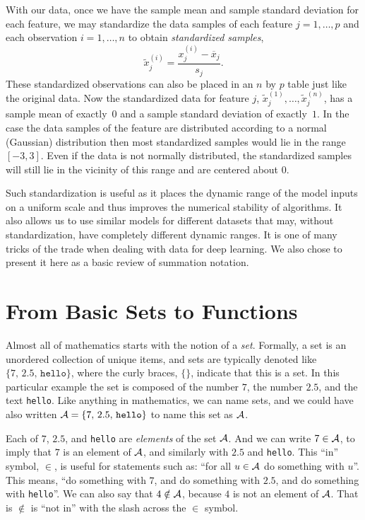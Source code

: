 \documentclass[12pt]{article}
\begin{document}
With our data, once we have the sample mean and sample standard deviation for each feature, we may standardize the data samples of each feature $j=1,\ldots,p$ and each observation $i=1,\ldots,n$ to obtain \textit{standardized samples},
%
\begin{equation}
\label{eq:ref-stand-z}
\tilde{x}^{(i)}_j = \frac{x^{(i)}_j - \overline{x}_j}{s_j}.
\end{equation}
%
These standardized observations can also be placed in an $n$ by $p$ table just like the original data. Now the standardized data for feature $j$, $\tilde{x}_j^{(1)}, \ldots, \tilde{x}_j^{(n)}$, has a sample mean of exactly~$0$ and a sample standard deviation of exactly~$1$. In the case the data samples of the feature are distributed according to a normal (Gaussian) distribution then most standardized samples would lie in the range $[-3,3]$. Even if the data is not normally distributed, the standardized samples will still lie in the vicinity of this range and are centered about $0$.

Such standardization is useful as it places the dynamic range of the model inputs on a uniform scale and thus improves the numerical stability of algorithms. It also allows us to use similar models for different datasets that may, without standardization, have completely different dynamic ranges. It is one of many tricks of the trade when dealing with data for deep learning. We also chose to present it here as a basic review of summation notation.

\section{From Basic Sets to Functions}
\label{sec:sets-and-functions}

Almost all of mathematics starts with the notion of a {\em set}. Formally, a set is an unordered collection of unique items, and sets are typically denoted like $\{7,\, 2.5,\, \texttt{hello}\}$, where the curly braces, $\{\}$, indicate that this is a set. In this particular example the set is composed of the number $7$, the number $2.5$, and the text \texttt{hello}. Like anything in mathematics, we can name sets, and we could have also written ${\cal A} = \{7,\, 2.5,\, \texttt{hello}\}$ to name this set as  ${\cal A}$.

Each of $7$, $2.5$, and \texttt{hello} are {\em elements} of the set ${\cal A}$. And we can write $7 \in {\cal A}$, to imply that $7$ is an element of ${\cal A}$, and similarly with $2.5$ and \texttt{hello}. This ``in'' symbol, $\in$, is useful for statements such as: ``for all $u \in {\cal A}$ do something with $u$''. This means, ``do something with $7$, and do something with $2.5$, and do something with \texttt{hello}''. We can also say that $4 \notin {\cal A}$, because $4$ is not an element of ${\cal A}$. That is $\not\in$ is ``not in'' with the slash across the $\in$ symbol. 
\end{document}
